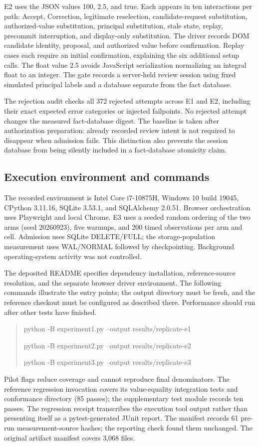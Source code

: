 \documentclass[11pt,a4paper]{article}
\begin{document}
E2 uses the JSON values 100, 2.5, and true. Each appears in ten interactions per path: Accept, Correction, legitimate reselection, candidate-request substitution, authorized-value substitution, principal substitution, stale state, replay, precommit interruption, and display-only substitution. The driver records DOM candidate identity, proposal, and authorized value before confirmation. Replay cases each require an initial confirmation, explaining the six additional setup calls. The float value 2.5 avoids JavaScript serialization normalizing an integral float to an integer. The gate records a server-held review session using fixed simulated principal labels and a database separate from the fact database.

The rejection audit checks all 372 rejected attempts across E1 and E2, including their exact expected error categories or injected failpoints. No rejected attempt changes the measured fact-database digest. The baseline is taken after authorization preparation: already recorded review intent is not required to disappear when admission fails. This distinction also prevents the session database from being silently included in a fact-database atomicity claim.

\subsection{Execution environment and commands}

The recorded environment is Intel Core i7-10875H, Windows 10 build 19045, CPython 3.11.16, SQLite 3.53.1, and SQLAlchemy 2.0.51. Browser orchestration uses Playwright and local Chrome. E3 uses a seeded random ordering of the two arms (seed 20260923), five warmups, and 200 timed observations per arm and cell. Admission uses SQLite DELETE/FULL; the storage-population measurement uses WAL/NORMAL followed by checkpointing. Background operating-system activity was not controlled.

The deposited README specifies dependency installation, reference-source resolution, and the separate browser driver environment. The following commands illustrate the entry points; the output directory must be fresh, and the reference checkout must be configured as described there. Performance should run after other tests have finished.
\begin{quote}\small\ttfamily
python -B experiment1.py --output results/replicate-e1\par
python -B experiment2.py --output results/replicate-e2\par
python -B experiment3.py --output results/replicate-e3
\end{quote}
Pilot flags reduce coverage and cannot reproduce final denominators. The reference regression invocation covers its value-equality integration tests and conformance directory (85 passes); the supplementary test module records ten passes. The regression receipt transcribes the execution tool output rather than presenting itself as a pytest-generated JUnit report. The manifest records 61 pre-run measurement-source hashes; the reporting check found them unchanged. The original artifact manifest covers 3,068 files.
\end{document}
